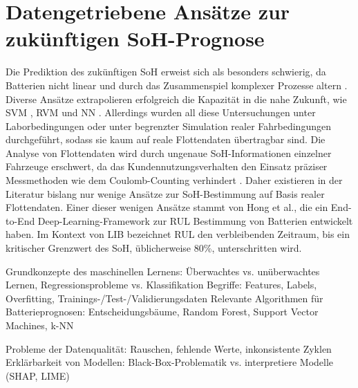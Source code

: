 \section{Datengetriebene Ansätze zur zukünftigen \acs{SoH}-Prognose}

Die Prediktion des zukünftigen \acs{SoH} erweist sich als besonders schwierig, da Batterien nicht linear und durch das Zusammenspiel komplexer Prozesse altern \cite{SOHComplexity}. Diverse Ansätze extrapolieren erfolgreich die Kapazität in die nahe Zukunft, wie \ac{SVM} \cite{urlSVM}, \ac{RVM} \cite{RVM} und \acs{NN} \cite{SOHNeuralNetworks}. Allerdings wurden all diese Untersuchungen unter Laborbedingungen oder unter begrenzter Simulation realer Fahrbedingungen durchgeführt, sodass sie kaum auf reale Flottendaten übertragbar sind. Die Analyse von Flottendaten wird durch ungenaue \acs{SoH}-Informationen einzelner Fahrzeuge erschwert, da das Kundennutzungsverhalten den Einsatz präziser Messmethoden wie dem Coulomb-Counting verhindert \cite{SOHCoulombCounting}. Daher existieren in der Literatur bislang nur wenige Ansätze zur \acs{SoH}-Bestimmung auf Basis realer Flottendaten. Einer dieser wenigen Ansätze stammt von Hong et al., die ein End-to-End Deep-Learning-Framework zur \ac{RUL} Bestimmung von Batterien entwickelt haben. Im Kontext von \acs{LIB} bezeichnet \acs{RUL} den verbleibenden Zeitraum, bis ein kritischer Grenzwert des \acs{SoH}, üblicherweise 80\%, unterschritten wird.



Grundkonzepte des maschinellen Lernens: Überwachtes vs. unüberwachtes Lernen, Regressionsprobleme vs. Klassifikation
Begriffe: Features, Labels, Overfitting, Trainings-/Test-/Validierungsdaten
Relevante Algorithmen für Batterieprognosen: Entscheidungsbäume, Random Forest, Support Vector Machines, k-NN

Probleme der Datenqualität: Rauschen, fehlende Werte, inkonsistente Zyklen
Erklärbarkeit von Modellen: Black-Box-Problematik vs. interpretiere Modelle (SHAP, LIME)